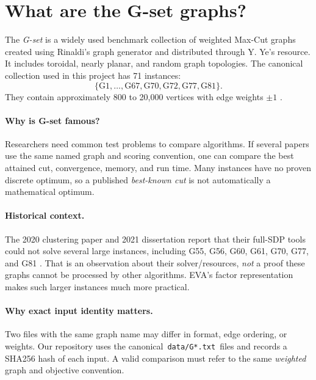 \documentclass[10pt,letterpaper]{article}
\begin{document}
\section{What are the G-set graphs?}
\label{sec:gset}
The \emph{G-set} is a widely used benchmark collection of weighted Max-Cut graphs created using Rinaldi's graph generator and distributed through Y. Ye's resource. It includes toroidal, nearly planar, and random graph topologies. The canonical collection used in this project has 71 instances:
\begin{equation}\label{eq:gset-ids}
 \{\mathrm{G1},\ldots,\mathrm{G67},
 \mathrm{G70},\mathrm{G72},\mathrm{G77},\mathrm{G81}\}.
\end{equation}
They contain approximately 800 to 20,000 vertices with edge weights $\pm1$ \cite{rodriguez2020,thesis2021}.

\paragraph{Why is G-set famous?} Researchers need common test problems to compare algorithms. If several papers use the same named graph and scoring convention, one can compare the best attained cut, convergence, memory, and run time. Many instances have no proven discrete optimum, so a published \emph{best-known cut} is not automatically a mathematical optimum.

\paragraph{Historical context.} The 2020 clustering paper and 2021 dissertation report that their full-SDP tools could not solve several large instances, including G55, G56, G60, G61, G70, G77, and G81 \cite{rodriguez2020,thesis2021}. That is an observation about their solver/resources, \emph{not} a proof these graphs cannot be processed by other algorithms. EVA's factor representation makes such larger instances much more practical.

\paragraph{Why exact input identity matters.} Two files with the same graph name may differ in format, edge ordering, or weights. Our repository uses the canonical \,\texttt{data/G*.txt}\, files and records a SHA256 hash of each input. A valid comparison must refer to the same \emph{weighted} graph and objective convention.
\end{document}
